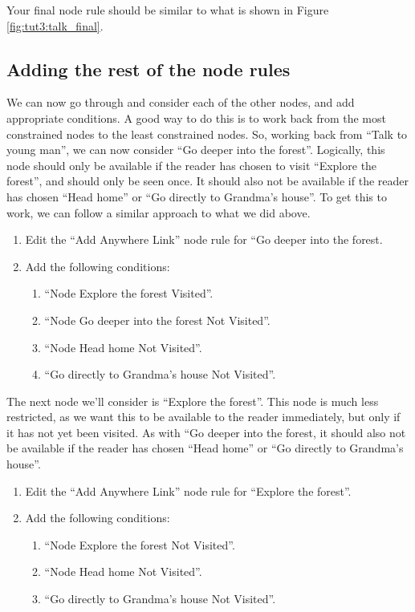 \documentclass{article}
\begin{document}
Your final node rule should be similar to what is shown in Figure
\ref{fig:tut3:talk_final}.

\subsection{Adding the rest of the node rules}

We can now go through and consider each of the other nodes, and add appropriate
conditions. A good way to do this is to work back from the most constrained
nodes to the least constrained nodes. So, working back from ``Talk to young
man'', we can now consider ``Go deeper into the forest''. Logically, this node
should only be available if the reader has chosen to visit ``Explore the
forest'', and should only be seen once. It should also not be available if the
reader has chosen ``Head home'' or ``Go directly to Grandma's house''. To get
this to work, we can follow a similar approach to what we did above.

\begin{enumerate}
  \item Edit the ``Add Anywhere Link'' node rule for ``Go deeper into the
  forest.
  \item Add the following conditions:
  \begin{enumerate}
  \item``Node Explore the forest Visited''.
  \item ``Node Go deeper into the forest Not Visited''.
  \item ``Node Head home Not Visited''.
  \item ``Go directly to Grandma's house Not Visited''.
  \end{enumerate}
\end{enumerate}

The next node we'll consider is ``Explore the forest''. This node is much less
restricted, as we want this to be available to the reader immediately, but only
if it has not yet been visited. As with ``Go deeper into the forest, it should
also not be available if the reader has chosen ``Head home'' or ``Go directly
to Grandma's house''.

\begin{enumerate}
  \item Edit the ``Add Anywhere Link'' node rule for ``Explore the forest''.
  \item Add the following conditions: 
  \begin{enumerate}
  \item ``Node Explore the forest Not Visited''.
  \item ``Node Head home Not Visited''.
  \item ``Go directly to Grandma's house Not Visited''.
\end{enumerate}
\end{enumerate}
\end{document}
